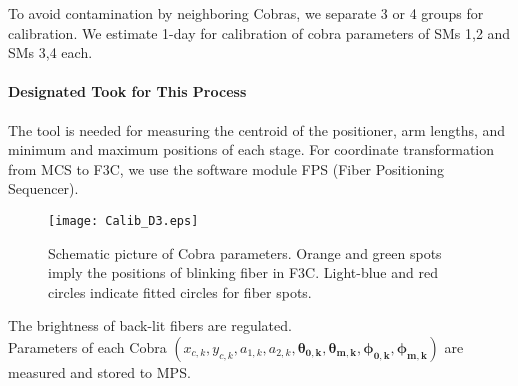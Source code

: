 To avoid contamination by neighboring Cobras, we separate 3 or 4 groups for calibration. 
We estimate 1-day for calibration of cobra parameters of SMs 1,2 and SMs 3,4 each.


\paragraph{Designated Took for This Process}
The tool is needed for measuring the centroid of the positioner, arm lengths, and minimum and maximum positions of each stage.
For coordinate transformation from MCS to F3C, we use the software module FPS (Fiber Positioning Sequencer).

\begin{figure}[!ht]
\begin{center}
\texttt{[image: Calib\_D3.eps]}
\end{center}
\caption{Schematic picture of Cobra parameters.
Orange and green spots imply the positions of blinking fiber in F3C.
Light-blue and red circles indicate fitted circles for fiber spots.
}
\label{fig:Cobraparams}
\end{figure}


\begin{itembox}[l]{}
The brightness of back-lit fibers are regulated. \\
Parameters of each Cobra $(x_{c,k}, y_{c,k}, a_{1,k}, a_{2,k}, \bm{\theta _{0,k}}, \bm{\theta _{m,k}}, \bm{\phi _{0,k}}, \bm{\phi _{m,k}})$ are measured and stored to MPS.

\end{itembox}